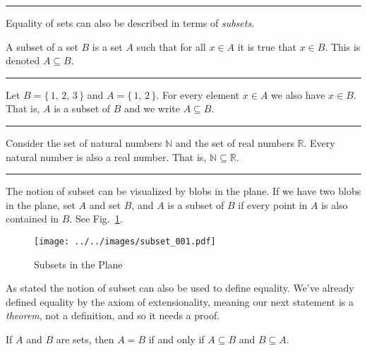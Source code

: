             \hrule\par\hfill\par
            Equality of sets can also be described in terms of
            \textit{subsets}.
            \begin{definition}
                A subset of a set $B$ is a set $A$ such that for all
                $x\in{A}$ it is true that $x\in{B}$. This is denoted
                $A\subseteq{B}$.
            \end{definition}
            \hrule
            \begin{example}
                Let $B=\{\,1,\,2,\,3\,\}$ and $A=\{\,1,\,2\,\}$. For every
                element $x\in{A}$ we also have $x\in{B}$. That is,
                $A$ is a subset of $B$ and we write $A\subseteq{B}$.
            \end{example}
            \hrule
            \begin{example}
                Consider the set of natural numbers $\mathbb{N}$ and the set of
                real numbers $\mathbb{R}$. Every natural number is also a
                real number. That is, $\mathbb{N}\subseteq\mathbb{R}$.
            \end{example}
            \hrule\par\hfill\par
            The notion of subset can be visualized by blobs in the plane.
            If we have two blobs in the plane, set $A$ and set $B$, and $A$ is
            a subset of $B$ if every point in $A$ is also contained in $B$.
            See Fig.~\ref{fig:subsets_in_plane}.
            \begin{figure}
                \centering
                \texttt{[image: ../../images/subset\_001.pdf]}
                \caption{Subsets in the Plane}
                \label{fig:subsets_in_plane}
            \end{figure}
            \par\hfill\par
            As stated the notion of subset can also be used to define equality.
            We've already defined equality by the axiom of extensionality,
            meaning our next statement is a \textit{theorem}, not a definition,
            and so it needs a proof.
            \begin{theorem}
                If $A$ and $B$ are sets, then $A=B$ if and only if
                $A\subseteq{B}$ and $B\subseteq{A}$.
            \end{theorem}
